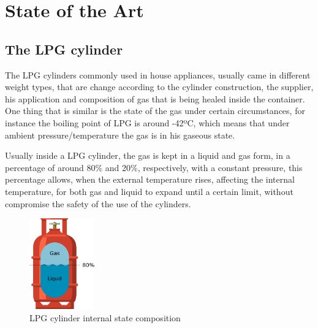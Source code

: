 \cleardoublepage
\chapter{State of the Art}\label{chap:stArt}


\section{The LPG cylinder}
The LPG cylinders commonly used in house appliances, usually came in different weight types, that are change according to the cylinder construction, the supplier, his application and composition of gas that is being healed inside the container. One thing that is similar is the state of the gas under certain circumstances, for instance the boiling point of LPG is around -42ºC, which means that under ambient pressure/temperature the gas is in his gaseous state. 

Usually inside a LPG cylinder, the gas is kept in a liquid and gas form, in a percentage of around 80\% and 20\%, respectively, with a constant pressure, this percentage allows, when the external temperature rises, affecting the internal temperature, for both gas and liquid to expand until a certain limit, without compromise the safety of the use of the cylinders.
\begin{figure}[!htb]
    \centering
    \includegraphics[width=0.25\textwidth]{Chapters/2CHP/Diagrams/bottleBaseliqGas.eps}
    \caption{LPG cylinder internal state composition}
    \label{fig:intcomplpg}
\end{figure}

